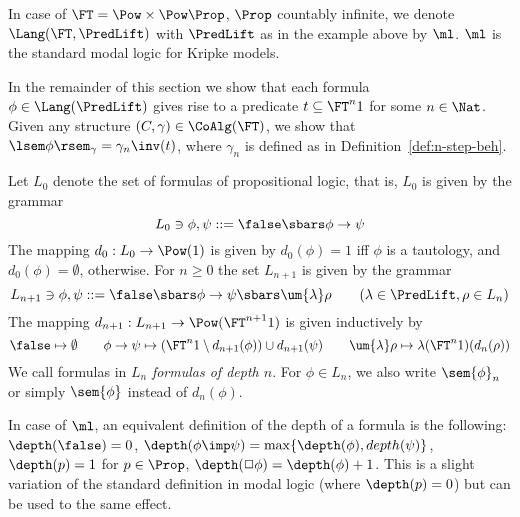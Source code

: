 \documentclass{entcs}
\begin{document}
\begin{notn}
  In case of $\FT=\Pow\times\Pow\Prop$, $\Prop$ countably infinite, we denote
  $\Lang(\FT,\PredLift)$ with $\PredLift$ as in the example above by $\ml$.
  $\ml$ is the standard modal logic for Kripke models.
\end{notn}


In the remainder of this section we show that each formula $\phi \in
\Lang(\PredLift)$ gives rise to a predicate $t \subseteq \FT^n 1$ for
some $n \in \Nat$. Given any structure $(C, \gamma) \in \CoAlg(\FT)$,
we show that $\lsem \phi \rsem_\gamma = \gamma_n\inv(t)$, where
$\gamma_n$ is defined as in Definition~\ref{def:n-step-beh}.

\begin{defn}\label{def:depth}
Let $L_0$ denote the set of formulas of propositional logic, that is, $L_0$ is
given by the grammar 
\[
  L_0 \ni \phi, \psi  ::= \false \sbars \phi \to \psi
\]
The mapping $d_0: L_0 \to \Pow(1)$ is given by $d_0(\phi) = 1$ iff $\phi$ is a
tautology, and $d_0(\phi) = \emptyset$, otherwise.
%
For $n \geq 0$ the set $L_{n+1}$ is given by the grammar
\[
  L_{n+1} \ni \phi, \psi ::= \false \sbars \phi \to \psi \sbars \um{\lambda} \rho
        \qquad (\lambda \in \PredLift, \rho \in L_n)
\]
The mapping $d_{n+1}: L_{n+1} \to \Pow(\FT^{n+1} 1)$ is given inductively by
\[
  \false \mapsto \emptyset \qquad
        \phi \to \psi \mapsto (\FT^n 1 \setminus d_{n+1}(\phi)) \cup d_{n+1} (\psi)
        \qquad
        \um{\lambda} \rho \mapsto \lambda(\FT^n 1)(d_n(\rho))
\]
We call formulas in $L_n$ \emph{formulas of depth $n$}. For $\phi\in L_n$, we
also write $\sem{\phi}_n$ or simply $\sem{\phi}$ instead of $d_n(\phi)$.
\end{defn}

\begin{example}\label{exle:depth-ml}
  In case of $\ml$, an equivalent definition of the depth of a formula
  is the following: $\depth(\false)=0$,
  $\depth(\phi\imp\psi)=\max\{\depth(\phi),depth(\psi)\}$,
  $\depth(p)=1$ for $p\in\Prop$, $\depth(\Box\phi)=\depth(\phi)+1$.
  This is a slight variation of the standard definition in modal logic
  (where $\depth(p)=0$) but can be used to the same effect.
\end{example}
\end{document}

